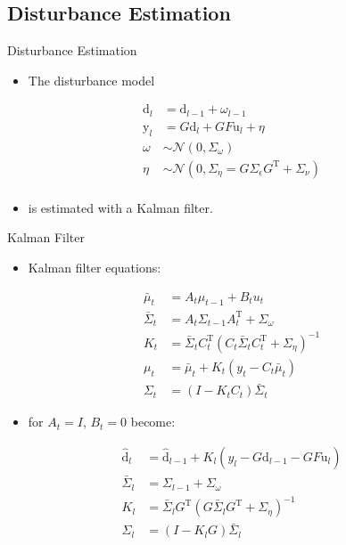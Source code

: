 \documentclass[handout]{beamer}
\newcommand{\liftedinput}{\mathrm{u}}
\newcommand{\liftedobs}{\mathrm{y}}
\newcommand{\disturbance}{\mathrm{d}}
\begin{document}
\subsection{Disturbance Estimation}
%
\begin{frame}{Disturbance Estimation}
\begin{itemize}
\item The disturbance model \pause
\linebreak
\end{itemize}
\begin{equation}
\begin{aligned}
\disturbance_l &= \disturbance_{l-1} + \omega_{l-1} \\
\liftedobs_l &= G\disturbance_l + GF\liftedinput_l + \eta \\
\omega &\sim \mathcal{N}(0,\Sigma_{\omega}) \\
\eta &\sim \mathcal{N}(0,\Sigma_{\eta} = G\Sigma_{\epsilon}G^{\mathrm{T}} + \Sigma_{\nu}) \\
\end{aligned}
\end{equation}
\pause
\begin{itemize}
\item is estimated with a Kalman filter. \pause
\end{itemize}
\end{frame}
%
\begin{frame}{Kalman Filter}
\begin{itemize}
\item Kalman filter equations: \pause
\end{itemize}
\begin{equation}
\begin{aligned}
\bar{\mu}_t &= A_t\mu_{t-1} + B_t u_t \\
\bar{\Sigma}_t &= A_t\Sigma_{t-1}A_t^{\mathrm{T}} + \Sigma_{\omega} \\
K_t &= \bar{\Sigma}_t C_t^{\mathrm{T}}(C_t \bar{\Sigma}_t C_t^{\mathrm{T}} + \Sigma_{\eta})^{-1} \\
\mu_t &= \bar{\mu}_t + K_t (y_t - C_t \bar{\mu}_t) \\
\Sigma_t &= (I - K_t C_t)\bar{\Sigma}_t
\end{aligned}
\end{equation}
\pause
\begin{itemize}
\item for $A_t = I$, $B_t = 0$ become: \pause
\linebreak
\end{itemize}
\begin{equation}
\begin{aligned}
\hat{\disturbance}_l &= \hat{\disturbance}_{l-1} + K_{l}(y_l - G\hat{\disturbance}_{l-1} - GF\liftedinput_l) \\
\bar{\Sigma}_l &= \Sigma_{l-1} + \Sigma_{\omega} \\
K_l &= \bar{\Sigma}_l G^{\mathrm{T}}(G\bar{\Sigma}_l G^{\mathrm{T}} + \Sigma_{\eta})^{-1} \\
\Sigma_{l} &= (I - K_l G)\bar{\Sigma}_l
\end{aligned}
\end{equation}
\end{frame}
%
\end{document}
